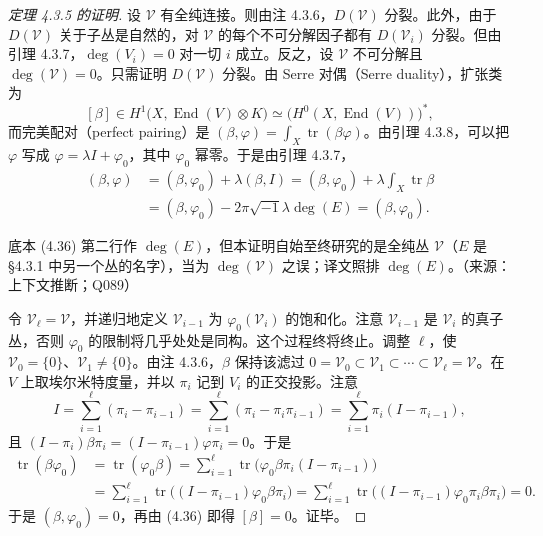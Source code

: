 \begin{proof}[定理 4.3.5 的证明]
设 $\mathcal{V}$ 有全纯连接。则由注 4.3.6，$D(\mathcal{V})$ 分裂。此外，由于 $D(\mathcal{V})$ 关于子丛是自然的，对 $\mathcal{V}$ 的每个不可分解因子都有 $D(\mathcal{V}_i)$ 分裂。但由引理 4.3.7，$\deg(V_i)=0$ 对一切 $i$ 成立。反之，设 $\mathcal{V}$ 不可分解且 $\deg(\mathcal{V})=0$。只需证明 $D(\mathcal{V})$ 分裂。由 Serre 对偶（Serre duality），扩张类为
\[
[\beta]\in H^1\bigl(X,\operatorname{End}(V)\otimes K\bigr)
\simeq\bigl(H^0(X,\operatorname{End}(V))\bigr)^*,
\]
而完美配对（perfect pairing）是 $(\beta,\varphi)=\int_X\operatorname{tr}(\beta\varphi)$。由引理 4.3.8，可以把 $\varphi$ 写成 $\varphi=\lambda I+\varphi_0$，其中 $\varphi_0$ 幂零。于是由引理 4.3.7，
\begin{equation}
\begin{aligned}
(\beta,\varphi)&=(\beta,\varphi_0)+\lambda(\beta,I)
=(\beta,\varphi_0)+\lambda\int_X\operatorname{tr}\beta\\
&=(\beta,\varphi_0)-2\pi\sqrt{-1}\lambda\deg(E)=(\beta,\varphi_0).
\end{aligned}
\label{eq:4.36}\tag{4.36}
\end{equation}
\begin{annote}
底本 (4.36) 第二行作 $\deg(E)$，但本证明自始至终研究的是全纯丛 $\mathcal{V}$（$E$ 是 §4.3.1 中另一个丛的名字），当为 $\deg(\mathcal{V})$ 之误；译文照排 $\deg(E)$。（来源：上下文推断；Q089）
\end{annote}
令 $\mathcal{V}_\ell=\mathcal{V}$，并递归地定义 $\mathcal{V}_{i-1}$ 为 $\varphi_0(\mathcal{V}_i)$ 的饱和化。注意 $\mathcal{V}_{i-1}$ 是 $\mathcal{V}_i$ 的真子丛，否则 $\varphi_0$ 的限制将几乎处处是同构。这个过程终将终止。调整 $\ell$，使 $\mathcal{V}_0=\{0\}$、$\mathcal{V}_1\ne\{0\}$。由注 4.3.6，$\beta$ 保持该滤过 $0=\mathcal{V}_0\subset\mathcal{V}_1\subset\cdots\subset\mathcal{V}_\ell=\mathcal{V}$。在 $V$ 上取埃尔米特度量，并以 $\pi_i$ 记到 $V_i$ 的正交投影。注意
\[
I=\sum_{i=1}^{\ell}(\pi_i-\pi_{i-1})
=\sum_{i=1}^{\ell}(\pi_i-\pi_i\pi_{i-1})
=\sum_{i=1}^{\ell}\pi_i(I-\pi_{i-1}),
\]
且 $(I-\pi_i)\beta\pi_i=(I-\pi_{i-1})\varphi\pi_i=0$。于是
\[
\begin{aligned}
\operatorname{tr}(\beta\varphi_0)
&=\operatorname{tr}(\varphi_0\beta)
=\sum_{i=1}^{\ell}\operatorname{tr}\bigl(\varphi_0\beta\pi_i(I-\pi_{i-1})\bigr)\\
&=\sum_{i=1}^{\ell}\operatorname{tr}\bigl((I-\pi_{i-1})\varphi_0\beta\pi_i\bigr)
=\sum_{i=1}^{\ell}\operatorname{tr}\bigl((I-\pi_{i-1})\varphi_0\pi_i\beta\pi_i\bigr)=0.
\end{aligned}
\]
于是 $(\beta,\varphi_0)=0$，再由 (4.36) 即得 $[\beta]=0$。证毕。
\end{proof}
